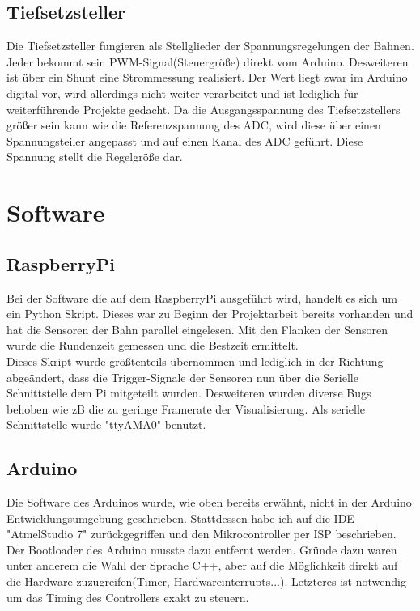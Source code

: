 \documentclass[a4paper, 11pt]{report}
\begin{document}
	\section{Tiefsetzsteller}
		Die Tiefsetzsteller fungieren als Stellglieder der Spannungsregelungen der Bahnen.
		Jeder bekommt sein PWM-Signal(Steuergröße) direkt vom Arduino. Desweiteren ist über ein Shunt eine
		Strommessung realisiert. Der Wert liegt zwar im Arduino digital vor, wird allerdings nicht weiter
		verarbeitet und ist lediglich für weiterführende Projekte gedacht. Da die Ausgangsspannung des
		Tiefsetzstellers größer sein kann wie die Referenzspannung des ADC,
		wird diese über einen Spannungsteiler angepasst und auf einen Kanal des ADC geführt.
		Diese Spannung stellt die Regelgröße dar.
	\newpage

\chapter{Software}
	\section{RaspberryPi}

		Bei der Software die auf dem RaspberryPi ausgeführt wird, handelt es sich um ein Python Skript.
		Dieses war zu Beginn der Projektarbeit bereits vorhanden und hat die Sensoren
		der Bahn parallel eingelesen. Mit den Flanken der Sensoren wurde die Rundenzeit gemessen
		und die Bestzeit ermittelt.\\
		Dieses Skript wurde größtenteils übernommen und lediglich in der Richtung abgeändert,
		dass die Trigger-Signale der Sensoren nun über die Serielle Schnittstelle dem Pi mitgeteilt wurden.
		Desweiteren wurden diverse Bugs behoben wie zB die zu geringe Framerate der Visualisierung.
		Als serielle Schnittstelle wurde "ttyAMA0" benutzt.
		\newpage
	\section{Arduino}
		Die Software des Arduinos wurde, wie oben bereits erwähnt, nicht in der Arduino Entwicklungsumgebung
		geschrieben. Stattdessen habe ich auf die IDE "AtmelStudio 7" zurückgegriffen und den Mikrocontroller
		per ISP beschrieben. Der Bootloader des Arduino musste dazu entfernt werden.
		Gründe dazu waren unter anderem die Wahl der Sprache C++,
		aber auf die Möglichkeit direkt auf die Hardware zuzugreifen(Timer, Hardwareinterrupts...).
		Letzteres ist notwendig um das Timing des Controllers exakt zu steuern.\\
\end{document}

